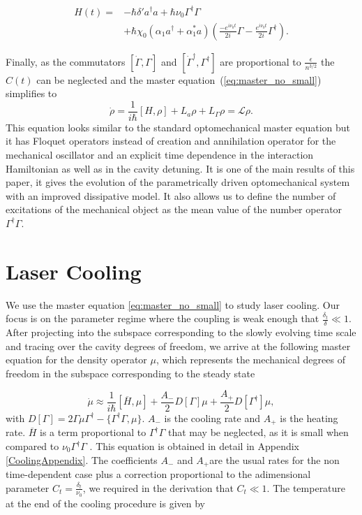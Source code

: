 \documentclass[reprint, amsmath,amssymb, aps,pra]{revtex4-1}
\begin{document}
\begin{align} \label{LCHamiltonian}
H(t) =& -\hbar \delta' a^{\dagger}a +\hbar\nu_0\Gamma^{\dagger}\Gamma \\
&+\hbar \chi_0(\alpha_1 a^{\dagger}+\alpha^*_1 a)(\frac{-e^{i\nu_0 t}}{2i}\Gamma-\frac{
e^{i\nu_0 t}}{2i} \nonumber\Gamma^{\dagger}).
\end{align} 

Finally, as the commutators $[\dot{\Gamma},\Gamma]$ and
$[\dot{\Gamma}^\dagger,\Gamma^\dagger]$ are proportional to
$\frac{\epsilon}{n^{3/2}}$ the $C(t)$ can be neglected and the master
equation~(\ref{eq:master_no_small}) simplifies to
\begin{equation}\label{LCMasterEq}
\dot{\rho} = \frac{1}{i\hbar}[H,\rho] +L_a\rho + L_\Gamma \rho = \mathcal{L}\rho.
\end{equation}
This equation looks similar to the standard optomechanical master
equation but it has Floquet operators instead of creation and
annihilation operator for the mechanical oscillator and an explicit
time dependence in the interaction Hamiltonian as well as in the
cavity detuning. It is one of the main results of this paper, it gives
the evolution of the parametrically driven optomechanical system with
an improved dissipative model. It also allows us to define the number
of excitations of the mechanical object as the mean value of the
number operator $\Gamma^\dagger\Gamma$.

\section{Laser Cooling}\label{LasCool}

We use the master equation \eqref{eq:master_no_small} to study laser
cooling. Our focus is on the parameter regime where the coupling is
weak enough that $\frac{\delta_t}{\delta}\ll 1$. After projecting into
the subspace corresponding to the slowly evolving time scale and
tracing over the cavity degrees of freedom, we arrive at the following
master equation for the density operator $\mu$, which represents the
mechanical degrees of freedom in the subspace corresponding to the
steady state 

\begin{equation}\label{eq:ProyectedMasterEqCooling}
\dot{\mu} \approx \frac{1}{i\hbar}[\overline{H},\mu] + \frac{A_-}{2}D[\Gamma]\mu + \frac{A_+}{2}D[\Gamma^\dagger]\mu, 
\end{equation}
with
$D[\Gamma] = 2\Gamma \mu \Gamma^\dagger -\{\Gamma^\dagger \Gamma,
\mu\}$. $A_-$ is the cooling rate and $A_+$ is the heating rate.
$\overline{H}$ is a term proportional to $\Gamma^\dagger \Gamma$ that
may be neglected, as it is small when compared to
$\nu_0 \Gamma^\dagger \Gamma$ . This equation is obtained in detail in
Appendix \ref{CoolingAppendix}. The coefficients $A_-$ and $A_+$are
the usual rates for the non time-dependent case plus a correction
proportional to the adimensional parameter
$C_t=\frac{\delta_t}{\nu_0}$, we required in the derivation that
$C_t \ll 1$. The temperature at the end of the cooling procedure is
given by
\end{document}
